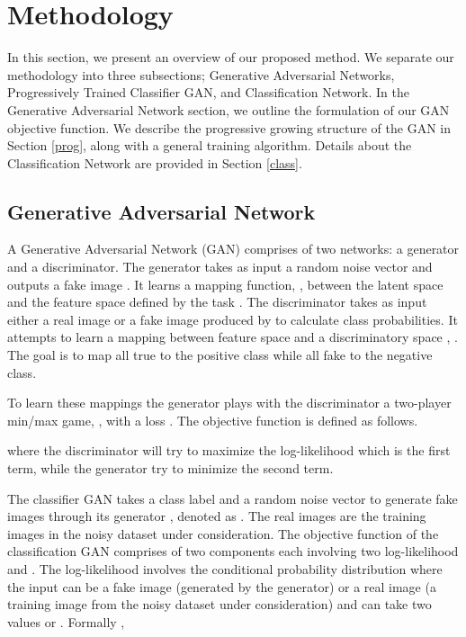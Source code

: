 \documentclass[runningheads]{llncs}
\begin{document}
\section{Methodology}\label{pm}
In this section, we present an overview of our proposed method. We separate our methodology into three subsections; Generative Adversarial Networks, Progressively Trained  Classifier GAN, and Classification Network. In the Generative Adversarial Network section, we outline the formulation of our GAN objective function. We describe the progressive growing structure of the GAN in Section \ref{prog}, along with  a general training algorithm. Details about the Classification Network are  provided in Section \ref{class}.

\subsection{Generative Adversarial Network}

A Generative Adversarial Network (GAN) \cite{Goodfellow-GAN} comprises of two networks:  a generator and a discriminator. The generator   takes  as input a random noise vector    and outputs a fake image . It learns a mapping function, , between the latent space  and the feature space defined by the task . The discriminator  takes as input   either  a real image or a fake image produced  by   to calculate class probabilities. It attempts to learn a mapping between feature space  and a discriminatory space , . The goal is to map all true  to the positive class while all fake  to the negative class.

To learn these mappings the generator  plays with the discriminator    a two-player min/max game, , with a loss .  The objective function \cite{Goodfellow-GAN} is defined  as follows. 

where the discriminator  will try to maximize the log-likelihood which is the first term, while the generator  try to minimize the second term.

The classifier GAN \cite{google}  takes a class label  and a random noise vector  to generate   fake images  through its generator , denoted as . The real images   are the training images in the noisy dataset under consideration.  The objective function of the classification GAN comprises of two components each involving two log-likelihood  and .  The log-likelihood   involves   the  conditional probability distribution  where  the input  can be a fake image   (generated by the generator) or a real image   (a training image from the noisy dataset under consideration) and  can take two values  or .  Formally \cite{google}, 
\end{document}
